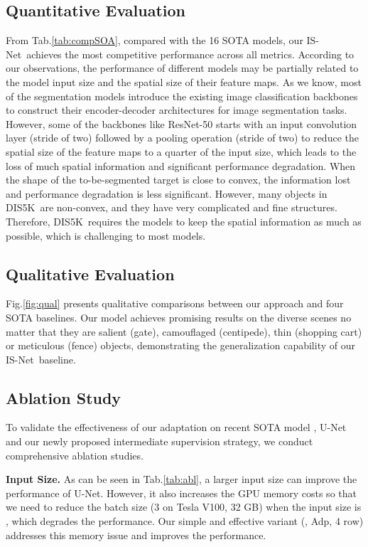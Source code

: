\documentclass[10pt,twocolumn,letterpaper]{article}
\newcommand{\figref}[1]{Fig.\ref{#1}}
\newcommand{\tabref}[1]{Tab.\ref{#1}}
\def\ourmodel{IS-Net}
\def \ourdataset{DIS5K}
\begin{document}
\subsection{Quantitative Evaluation}
From \tabref{tab:compSOA}, compared with the 16 SOTA models, our \ourmodel ~achieves the most competitive performance across all metrics. 
According to our observations, the performance of different models may be partially related to the model input size and the spatial size of their feature maps. As we know, most of the segmentation models introduce the existing image classification backbones to construct their encoder-decoder architectures for image segmentation tasks. However, some of the backbones like ResNet-50 \cite{he2016deep} starts with an input convolution layer (stride of two) followed by a pooling operation (stride of two) to reduce the spatial size of the feature maps to a quarter of the input size, which leads to the loss of much spatial information and significant performance degradation. When the shape of the to-be-segmented target is close to convex, the information lost and performance degradation is less significant. However, many objects in \ourdataset~are non-convex, and they have very complicated and fine structures. Therefore, \ourdataset~requires the models to keep the spatial information as much as possible, which is challenging to most models. 

\subsection{Qualitative Evaluation}

\figref{fig:qual} presents qualitative comparisons between our approach and four SOTA baselines. Our model achieves promising results on the diverse scenes no matter that they are salient (gate), camouflaged (centipede), thin (shopping cart) or meticulous (fence) objects, demonstrating the generalization capability of our \ourmodel~baseline.

\subsection{Ablation Study}
To validate the effectiveness of our adaptation on recent SOTA model \eg, U-Net and our newly proposed intermediate supervision strategy, we conduct comprehensive ablation studies. 

\noindent\textbf{Input Size.} As can be seen in \tabref{tab:abl}, 
a larger input size can improve the performance of U-Net. However, it also increases the GPU memory costs so that we need to reduce the batch size (3 on Tesla V100, 32 GB) when the input size is , which degrades the performance. Our simple and effective variant (\ie, Adp, 4 row) addresses this memory issue and improves the performance.
\end{document}

